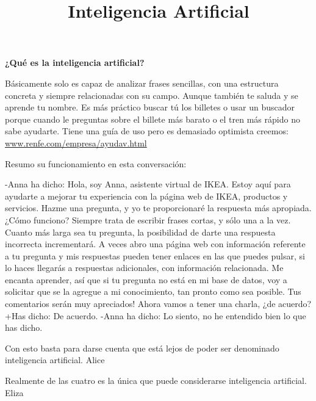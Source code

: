 \documentclass[spanish, a4paper, 12pt]{article} 	%
\begin{document}
\title{\textbf{Inteligencia Artificial}}
\maketitle



\newpage
\textbf{{¿Qué es la inteligencia artificial?}}


\begin{section}
	Básicamente solo es capaz de analizar frases sencillas, con una estructura concreta y siempre relacionadas con su campo.
	 Aunque también te saluda y se aprende tu nombre. Es más práctico buscar tú los billetes o usar un buscador porque 
	 cuando le preguntas sobre el billete más barato o el tren más rápido no sabe ayudarte.
	 Tiene una guía de uso pero es demasiado optimista creemos: \url{www.renfe.com/empresa/ayudav.html}
	 
	
	Resumo su funcionamiento en esta conversación:
	
	-Anna ha dicho: Hola, soy Anna, asistente virtual de IKEA. Estoy aquí para ayudarte a mejorar tu experiencia con la página 		web de IKEA, productos y servicios. Hazme una pregunta, y yo te proporcionaré la respuesta más apropiada. 
¿Cómo funciono? Siempre trata de escribir frases cortas, y sólo una a la vez. Cuanto más larga sea tu pregunta, la posibilidad de darte una respuesta incorrecta incrementará. A veces abro una página web con información referente a tu pregunta y mis respuestas pueden tener enlaces en las que puedes pulsar, si lo haces llegarás a respuestas adicionales, con información relacionada. Me encanta aprender, así que si tu pregunta no está en mi base de datos, voy a solicitar que se la agregue a mi conocimiento, tan pronto como sea posible. Tus comentarios serán muy apreciados! Ahora vamos a tener una charla, ¿de acuerdo?
	+Has dicho: De acuerdo.
	-Anna ha dicho: Lo siento, no he entendido bien lo que has dicho.
	
	Con esto basta para darse cuenta que está lejos de poder ser denominado inteligencia artificial.
		Alice
		
		Realmente de las cuatro es la única que puede considerarse inteligencia artificial.
		Eliza
		

\end{section}
\end{document}
